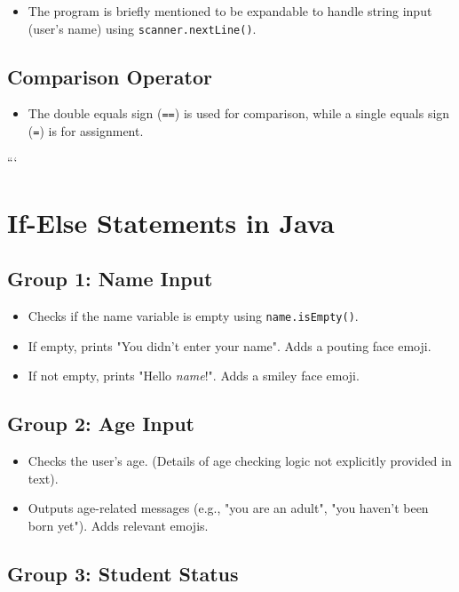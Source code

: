 \documentclass{article}
\begin{document}
\begin{itemize}
    \item The program is briefly mentioned to be expandable to handle string input (user's name) using \texttt{scanner.nextLine()}.
\end{itemize}

\subsection{Comparison Operator}

\begin{itemize}
    \item  The double equals sign (\texttt{==}) is used for comparison, while a single equals sign (\texttt{=}) is for assignment.
\end{itemize}
```


\section{If-Else Statements in Java}

\subsection{Group 1: Name Input}

\begin{itemize}
    \item Checks if the name variable is empty using \texttt{name.isEmpty()}.
    \item If empty, prints "You didn't enter your name".  Adds a pouting face emoji.
    \item If not empty, prints "Hello \textit{name}!". Adds a smiley face emoji.
\end{itemize}

\subsection{Group 2: Age Input}

\begin{itemize}
    \item  Checks the user's age.  (Details of age checking logic not explicitly provided in text).
    \item Outputs age-related messages (e.g., "you are an adult", "you haven't been born yet").  Adds relevant emojis.
\end{itemize}

\subsection{Group 3: Student Status}
\end{document}
